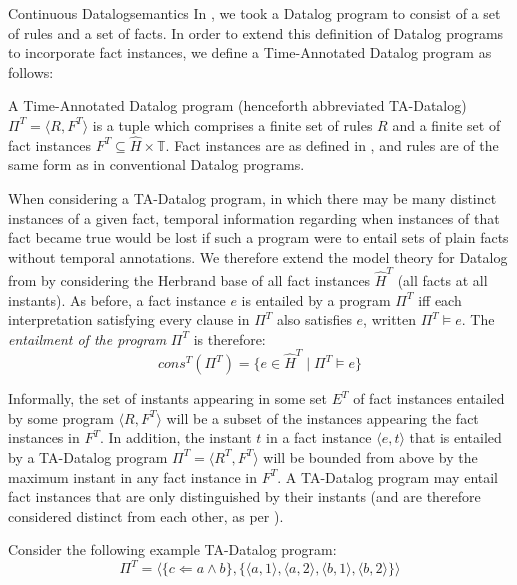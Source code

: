 \begin{nestedsection}{Continuous Datalog}{semantics}
In , we took a Datalog
program to consist of a set of rules and a set of facts.  In order to
extend this definition of Datalog programs to incorporate fact
instances, we define a Time-Annotated Datalog program as follows:

\begin{definition}

A Time-Annotated Datalog program (henceforth abbreviated TA-Datalog)
$\Pi^T = \langle R, F^T\rangle$ is a tuple which comprises a finite
set of rules $R$ and a finite set of fact instances $F^T \subseteq
\hat{H} \times \mathbb{T}$. Fact instances are as defined in
, and rules are of the same
form as in conventional Datalog programs.

When considering a TA-Datalog program, in which there may be many
distinct instances of a given fact, temporal information regarding
when instances of that fact became true would be lost if such a
program were to entail sets of plain facts without temporal
annotations. We therefore extend the model theory for Datalog from
 by considering the
Herbrand base of all fact instances $\hat{H}^T$ (all facts at all
instants). As before, a fact instance $e$ is entailed by a program
$\Pi^T$ iff each interpretation satisfying every clause in $\Pi^T$
also satisfies $e$, written $\Pi^T \models e$. The {\em entailment of the
program} $\Pi^T$ is therefore:
\[ cons^T(\Pi^T) = \{ e \in \hat{H}^T \mid \Pi^T \models e \} \]

Informally, the set of instants appearing in some set $E^T$ of fact
instances entailed by some program ${\langle R, F^T \rangle}$ will be
a subset of the instances appearing the fact instances in $F^T$.  In
addition, the instant $t$ in a fact instance $\langle e, t \rangle$
that is entailed by a TA-Datalog program $\Pi^T = \langle R^T, F^T
\rangle$ will be bounded from above by the maximum instant in any fact
instance in $F^T$. A TA-Datalog program may entail fact instances that
are only distinguished by their instants (and are therefore considered
distinct from each other, as per ).

Consider the following example TA-Datalog program:
\[
\Pi^T = \langle \{ c \Leftarrow a \land b \}, \{ \langle a, 1 \rangle, \langle a, 2 \rangle, \langle b, 1 \rangle, \langle b, 2 \rangle  \} \rangle
\]


\end{definition}
\end{nestedsection}
